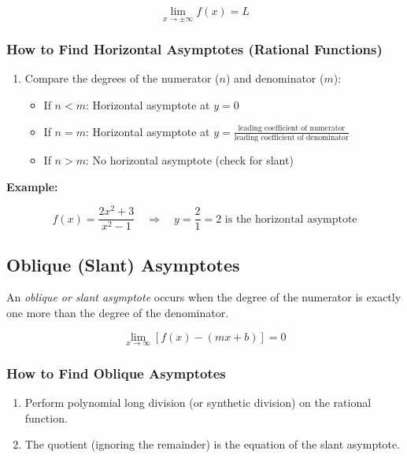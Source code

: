\[
    \lim_{x \to \pm\infty} f(x) = L
\]

\subsubsection{How to Find Horizontal Asymptotes (Rational Functions)}

\begin{enumerate}

    \item Compare the degrees of the numerator (\(n\)) and denominator (\(m\)):

    \begin{itemize}

        \item If \(n < m\): Horizontal asymptote at \(y = 0\)

        \item If \(n = m\): Horizontal asymptote at \(y = \frac{\text{leading coefficient of numerator}}
        {\text{leading coefficient of denominator}}\)

        \item If \(n > m\): No horizontal asymptote (check for slant)

    \end{itemize}

\end{enumerate}

\textbf{Example:}
\vspace{\baselineskip}

\[
    f(x) = \frac{2x^2 + 3}{x^2 - 1} \quad \Rightarrow \quad y = \frac{2}{1} = 2 
    \text{ is the horizontal asymptote}
\]

\subsection{Oblique (Slant) Asymptotes}

An \emph{oblique or slant asymptote} occurs when the degree of the numerator is exactly one more than 
the degree of the denominator.

\[
    \lim_{x \to \infty} [f(x) - (mx + b)] = 0
\]

\subsubsection{How to Find Oblique Asymptotes}

\begin{enumerate}
    
    \item Perform polynomial long division (or synthetic division) on the rational function.
    
    \item The quotient (ignoring the remainder) is the equation of the slant asymptote.

\end{enumerate}

